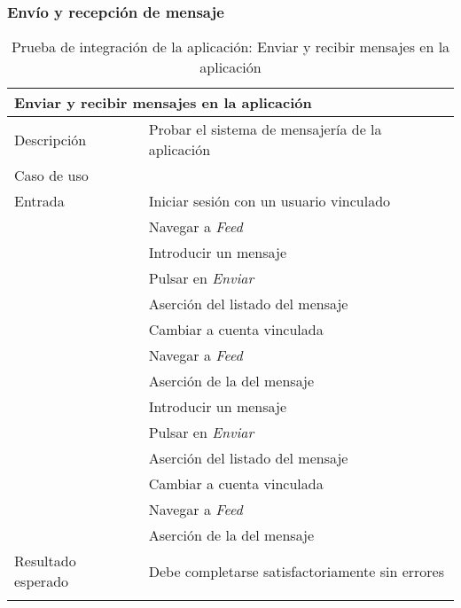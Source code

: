 \newpage
\subsubsection{Envío y recepción de mensaje}

\begin{longtable}{|p{} p{}|}
    \hline
    \multicolumn{2}{|l|}{\textbf{Enviar y recibir mensajes en la aplicación}} \\ \hline 
    Descripción                 & Probar el sistema de mensajería de la aplicación \\ \hline
    Caso de uso                 & \nameref{cu:enviar_mensajes} \\ \hline
    Entrada                     & Iniciar sesión con un usuario vinculado \\
                                & Navegar a \emph{Feed} \\ 
                                & Introducir un mensaje \\
                                & Pulsar en \emph{Enviar} \\
                                & Aserción del listado del mensaje \\
                                & Cambiar a cuenta vinculada \\
                                & Navegar a \emph{Feed} \\ 
                                & Aserción de la del mensaje \\
                                & Introducir un mensaje \\
                                & Pulsar en \emph{Enviar} \\
                                & Aserción del listado del mensaje \\
                                & Cambiar a cuenta vinculada \\
                                & Navegar a \emph{Feed} \\ 
                                & Aserción de la del mensaje \\
                                \hline
    Resultado esperado          & Debe completarse satisfactoriamente sin errores \\ \hline
    \caption{Prueba de integración de la aplicación: Enviar y recibir mensajes en la aplicación}
    \label{cp:i:app:enviar_recibir_mensajes}
\end{longtable}

